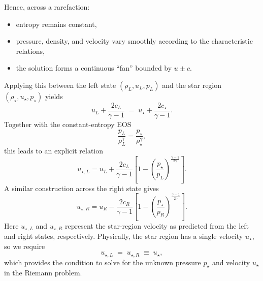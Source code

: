 \documentclass{article}
\begin{document}
\medskip
\noindent
Hence, across a rarefaction:
\begin{itemize}
  \item entropy remains constant,
  \item pressure, density, and velocity vary smoothly according to the 
        characteristic relations,
  \item the solution forms a continuous ``fan'' bounded by $u \pm c$.
\end{itemize}
Applying this between the left state $(\rho_L,u_L,p_L)$ and the star region $(\rho_\star,u_\star,p_\star)$ yields
\begin{equation}
u_L + \frac{2c_L}{\gamma-1} \;=\; u_\star + \frac{2c_\star}{\gamma-1}.
\label{eq:left-rarefaction-invariant}
\end{equation}
Together with the constant-entropy EOS
\begin{equation}
\frac{p_L}{\rho_L^\gamma} = \frac{p_\star}{\rho_\star^\gamma},
\end{equation}
this leads to an explicit relation
\begin{equation}
u_{\star,L} = u_L + \frac{2c_L}{\gamma-1}
\left[ 1 - \left(\frac{p_\star}{p_L}\right)^{\frac{\gamma-1}{2\gamma}} \right].
\label{eq:u-star-L}
\end{equation}
A similar construction across the right state gives
\begin{equation}
u_{\star,R} = u_R - \frac{2c_R}{\gamma-1}
\left[ 1 - \left(\frac{p_\star}{p_R}\right)^{\frac{\gamma-1}{2\gamma}} \right].
\label{eq:u-star-R}
\end{equation}
Here $u_{\star,L}$ and $u_{\star,R}$ represent the star-region velocity
as predicted from the left and right states, respectively.
Physically, the star region has a single velocity $u_\star$, so we require
\begin{equation}
u_{\star,L} \;=\; u_{\star,R} \;\equiv\; u_\star,
\end{equation}
which provides the condition to solve for the unknown pressure $p_\star$ and velocity $u_\star$ in the Riemann problem.
\end{document}
